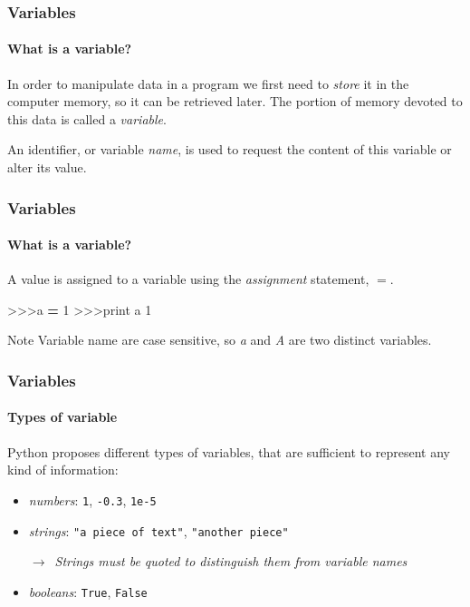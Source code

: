 \documentclass[handout]{beamer}
\def\prompt{>\hspace{-1pt}>\hspace{-1pt}>\/}
\newcommand{\comment}[1]{{\raggedright $\rightarrow$~\textit{\textsf{#1}}}}
\begin{document}
\begin{frame}
	\frametitle{Variables}
	\framesubtitle{What is a variable?}

	In order to manipulate data in a program we first need to \textit{store} it in the computer memory, so it can be retrieved later. The portion of memory devoted to this data is called a \textit{variable}.

	\pause
	\bigskip
	An identifier, or variable \textit{name}, is used to request the content of this variable or alter its value.
\end{frame}

\begin{frame}[fragile]
	\frametitle{Variables}
	\framesubtitle{What is a variable?}

	A value is assigned to a variable using the \textit{assignment} statement, $=$.

	\begin{semiverbatim}
		\prompt a \textbf{=} 1
		\prompt print a
		1
	\end{semiverbatim}

	\begin{block}{Note}
		Variable name are case sensitive, so \textit{a} and \textit{A} are two distinct variables.
	\end{block}
\end{frame}

\begin{frame}
	\frametitle{Variables}
	\framesubtitle{Types of variable}
	Python proposes different types of variables, that are sufficient to represent any kind of information:

	\begin{itemize}
		\item \textit{numbers}: \texttt{1}, \texttt{-0.3}, \texttt{1e-5}

		\medskip
		\item \textit{strings}: \texttt{"a piece of text"}, \texttt{"another piece"}

		\comment{Strings must be quoted to distinguish them from variable names}

		\medskip
		\item \textit{booleans}: \texttt{True}, \texttt{False}
	\end{itemize}
\end{frame}
\end{document}
